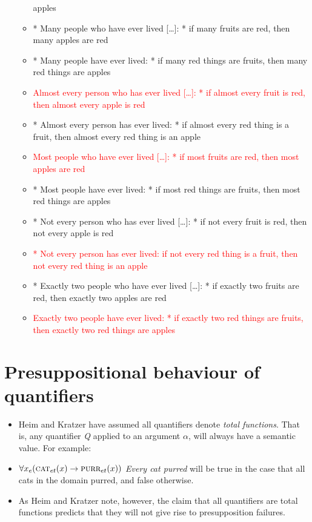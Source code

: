 \documentclass[a4paper]{article}
\begin{document}
\begin{itemize}
\begin{itemize}
    apples
  \item * Many people who have ever lived [\ldots]: * if many fruits are red, then many apples are red
  \item * Many people have ever lived: * if many red things are fruits, then many red things are
    apples
  \item \textcolor{red}{Almost every person who has ever lived [\ldots]: * if almost every fruit is red, then
      almost every apple is red}
  \item * Almost every person has ever lived: * if almost every red thing is a fruit, then almost
    every red thing is an apple
  \item \textcolor{red}{Most people who have ever lived [\ldots]: * if most fruits are red, then most apples are red}
  \item * Most people have ever lived: * if most red things are fruits, then most red things are
    apples
  \item * Not every person who has ever lived [\ldots]: * if not every fruit is red, then not every apple is red
  \item \textcolor{red}{* Not every person has ever lived: if not every red thing is a fruit, then not every
      red thing is an apple}
  \item * Exactly two people who have ever lived [\ldots]: * if exactly two fruits are red, then exactly two
    apples are red
  \item \textcolor{red}{Exactly two people have ever lived: * if exactly two red things are fruits, then exactly two red
    things are apples}
  \end{itemize}
\end{itemize}


\section{Presuppositional behaviour of quantifiers}
\begin{itemize}
\item Heim and Kratzer have assumed all quantifiers denote \emph{total functions}. That is, any quantifier \emph{Q} applied to an argument $\alpha$, will always have a semantic value. For example:
\item $\forall x_e(\textsc{cat}_{et}(x) -> \textsc{purr}_{et}(x))$ \emph{Every cat purred} will be true in the case that all cats in the domain purred, and false otherwise. 
\item As Heim and Kratzer note, however, the claim that all quantifiers are total functions predicts that they will not give rise to presupposition failures. 
\end{itemize}
\end{document}

